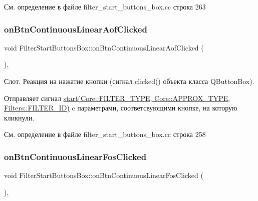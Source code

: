 См. определение в файле filter\+\_\+start\+\_\+buttons\+\_\+box.\+cc строка 263

\hypertarget{class_filter_start_buttons_box_a8afe02f419e8e98bdac1846c2b7db588}{}\label{class_filter_start_buttons_box_a8afe02f419e8e98bdac1846c2b7db588} 
\subsubsection{\texorpdfstring{on\+Btn\+Continuous\+Linear\+Aof\+Clicked}{onBtnContinuousLinearAofClicked}}
{\footnotesize\ttfamily void Filter\+Start\+Buttons\+Box\+::on\+Btn\+Continuous\+Linear\+Aof\+Clicked (\begin{DoxyParamCaption}{ }\end{DoxyParamCaption})\hspace{0.3cm}{\ttfamily [private]}, {\ttfamily [slot]}}

Слот. Реакция на нажатие кнопки (сигнал clicked() объекта класса Q\+Button\+Box).

Отправляет сигнал \hyperlink{class_filter_start_buttons_box_ac6e2a6555f1d388391f188f834b8e753}{start(\+Core\+::\+F\+I\+L\+T\+E\+R\+\_\+\+T\+Y\+P\+E, Core\+::\+A\+P\+P\+R\+O\+X\+\_\+\+T\+Y\+P\+E, Filters\+::\+F\+I\+L\+T\+E\+R\+\_\+\+I\+D)} c параметрами, соответсвующими кнопке, на которую кликнули. 

См. определение в файле filter\+\_\+start\+\_\+buttons\+\_\+box.\+cc строка 258

\hypertarget{class_filter_start_buttons_box_a2dafb5ddb0f1c4dbf1a5e88d356b5fdc}{}\label{class_filter_start_buttons_box_a2dafb5ddb0f1c4dbf1a5e88d356b5fdc} 
\subsubsection{\texorpdfstring{on\+Btn\+Continuous\+Linear\+Fos\+Clicked}{onBtnContinuousLinearFosClicked}}
{\footnotesize\ttfamily void Filter\+Start\+Buttons\+Box\+::on\+Btn\+Continuous\+Linear\+Fos\+Clicked (\begin{DoxyParamCaption}{ }\end{DoxyParamCaption})\hspace{0.3cm}{\ttfamily [private]}, {\ttfamily [slot]}}

